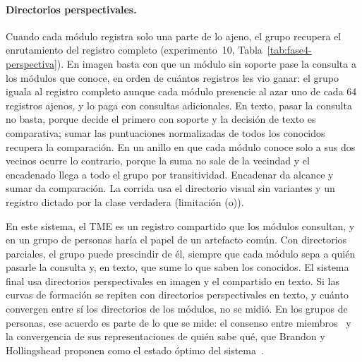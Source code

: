 \paragraph{Directorios perspectivales.}
Cuando cada módulo registra solo una parte de lo ajeno, el grupo recupera el
enrutamiento del registro completo (experimento~10,
Tabla~\ref{tab:fase4-perspectiva}).
En imagen basta con que un módulo sin soporte pase la consulta a los módulos que
conoce, en orden de cuántos registros les vio ganar: el grupo iguala al registro
completo aunque cada módulo presencie al azar uno de cada 64 registros ajenos, y lo
paga con consultas adicionales.
En texto, pasar la consulta no basta, porque decide el primero con soporte y la decisión
de texto es comparativa; sumar las puntuaciones normalizadas de todos los conocidos
recupera la comparación.
En un anillo en que cada módulo conoce solo a sus dos vecinos ocurre lo contrario, porque
la suma no sale de la vecindad y el encadenado llega a todo el grupo por transitividad.
Encadenar da alcance y sumar da comparación.
La corrida usa el directorio visual sin variantes y un registro dictado por la clase
verdadera (limitación (o)).

En este sistema, el TME es un registro compartido que los módulos consultan, y en un
grupo de personas haría el papel de un artefacto común.
Con directorios parciales, el grupo puede prescindir de él, siempre que
cada módulo sepa a quién pasarle la consulta y, en texto, que sume lo que saben los
conocidos.
El sistema final usa directorios perspectivales en imagen y el compartido en texto.
Si las curvas de formación se repiten con directorios perspectivales en texto, y
cuánto convergen entre sí los directorios de los módulos, no se midió.
En los grupos de personas, ese acuerdo es parte de lo que se mide: el consenso entre
miembros~\cite{austin2003transactive} y la convergencia de sus representaciones de quién
sabe qué, que Brandon y Hollingshead proponen como el estado óptimo del
sistema~\cite{brandon2004transactive}.

